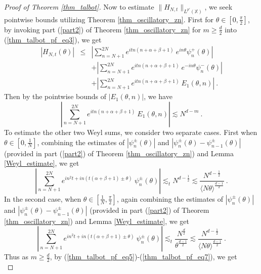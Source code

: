 \documentclass[12pt]{amsart}
\theoremstyle{definition}
\newcommand{\X}{\mathbb X}%
\numberwithin{equation}{section}
\begin{document}
\begin{proof}[Proof of Theorem \ref{thm_talbot}]
Now to estimate $\|H_{N,t}\|_{L^{p'}(\X)}$, we seek pointwise bounds utilizing Theorem \ref{thm_oscillatory_zn}. First for $\theta \in \left[0,\frac{\pi}{2}\right]$, by invoking part (\ref{part2}) of Theorem \ref{thm_oscillatory_zn} for $m \ge \frac{d}{2}$ into (\ref{thm_talbot_pf_eq3}), we get
\begin{eqnarray*}
\left|H_{N,t}(\theta)\right| &\le& \left|\sum_{n=N+1}^{2N} e^{itn(n+\alpha+\beta+1)}\:e^{in\theta}\psi^+_n(\theta)\right|\\
&&+ \left|\sum_{n=N+1}^{2N} e^{itn(n+\alpha+\beta+1)}\:e^{-in\theta}\psi^-_n(\theta)\right|\\
&&+\left|\sum_{n=N+1}^{2N} e^{itn(n+\alpha+\beta+1)}\:E_1(\theta, n)\right|\:.
\end{eqnarray*}
Then by the pointwise bounds of $\left|E_1(\theta, n)\right|$, we have
\begin{equation} \label{thm_talbot_pf_eq5}
\left|\sum_{n=N+1}^{2N} e^{itn(n+\alpha+\beta+1)}\:E_1(\theta, n)\right| \lesssim N^{d-m}\:.
\end{equation}
To estimate the other two Weyl sums, we consider two separate cases. First when $\theta \in \left[0,\frac{1}{N}\right]$, combining the estimates of $|\psi^\pm_n(\theta)|$ and $|\psi^\pm_n(\theta)-\psi^\pm_{n-1}(\theta)|$ (provided in part (\ref{part2}) of Theorem \ref{thm_oscillatory_zn}) and Lemma \ref{Weyl_estimate}, we get
\begin{equation} \label{thm_talbot_pf_eq6}
\left|\sum_{n=N+1}^{2N} e^{in^2t+in\left(t(\alpha+\beta+1)\pm \theta\right)}\:\psi^\pm_n(\theta)\right| \lesssim_t N^{d-\frac{1}{2}} \lesssim \frac{N^{d-\frac{1}{2}}}{\langle N\theta\rangle^{\frac{d-1}{2}}}\:.
\end{equation}
In the second case, when $\theta \in \left[\frac{1}{N},\frac{\pi}{2}\right]$, again combining the estimates of $|\psi^\pm_n(\theta)|$ and $|\psi^\pm_n(\theta)-\psi^\pm_{n-1}(\theta)|$ (provided in part (\ref{part2}) of Theorem \ref{thm_oscillatory_zn}) and Lemma \ref{Weyl_estimate}, we get
\begin{equation} \label{thm_talbot_pf_eq7}
\left|\sum_{n=N+1}^{2N} e^{in^2t+in\left(t(\alpha+\beta+1)\pm \theta\right)}\:\psi^\pm_n(\theta)\right| \lesssim_t \frac{N^{\frac{d}{2}}}{\theta^{\frac{d-1}{2}}} \lesssim \frac{N^{d-\frac{1}{2}}}{\langle N\theta\rangle^{\frac{d-1}{2}}}\:.
\end{equation}
Thus as $m \ge \frac{d}{2}$, by (\ref{thm_talbot_pf_eq5})-(\ref{thm_talbot_pf_eq7}), we get 
\begin{equation} \label{kernel_estimate1}

\end{equation}
\end{proof}
\end{document}
